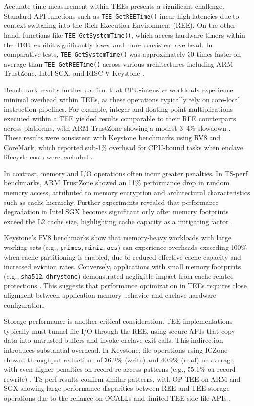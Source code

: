 Accurate time measurement within TEEs presents a significant challenge. Standard API functions such as \texttt{TEE\_GetREETime()} incur high latencies due to context switching into the Rich Execution Environment (REE). On the other hand, functions like \texttt{TEE\_GetSystemTime()}, which access hardware timers within the TEE, exhibit significantly lower and more consistent overhead. In comparative tests, \texttt{TEE\_GetSystemTime()} was approximately 30 times faster on average than \texttt{TEE\_GetREETime()} across various architectures including ARM TrustZone, Intel SGX, and RISC-V Keystone \cite{Suzaki2021}.

Benchmark results further confirm that CPU-intensive workloads experience minimal overhead within TEEs, as these operations typically rely on core-local instruction pipelines. For example, integer and floating-point multiplications executed within a TEE yielded results comparable to their REE counterparts across platforms, with ARM TrustZone showing a modest 3–4\% slowdown \cite{Suzaki2021}. These results were consistent with Keystone benchmarks using RV8 and CoreMark, which reported sub-1\% overhead for CPU-bound tasks when enclave lifecycle costs were excluded \cite{dayeol2019keystone}.

In contrast, memory and I/O operations often incur greater penalties. In TS-perf benchmarks, ARM TrustZone showed an 11\% performance drop in random memory access, attributed to memory encryption and architectural characteristics such as cache hierarchy. Further experiments revealed that performance degradation in Intel SGX becomes significant only after memory footprints exceed the L2 cache size, highlighting cache capacity as a mitigating factor \cite{Suzaki2021}.

Keystone's RV8 benchmarks show that memory-heavy workloads with large working sets (e.g., \texttt{primes}, \texttt{miniz}, \texttt{aes}) can experience overheads exceeding 100\% when cache partitioning is enabled, due to reduced effective cache capacity and increased eviction rates. Conversely, applications with small memory footprints (e.g., \texttt{sha512}, \texttt{dhrystone}) demonstrated negligible impact from cache-related protections \cite{dayeol2019keystone}. This suggests that performance optimization in TEEs requires close alignment between application memory behavior and enclave hardware configuration.

Storage performance is another critical consideration. TEE implementations typically must tunnel file I/O through the REE, using secure APIs that copy data into untrusted buffers and invoke enclave exit calls. This indirection introduces substantial overhead. In Keystone, file operations using IOZone showed throughput reductions of 36.2\% (write) and 40.9\% (read) on average, with even higher penalties on record re-access patterns (e.g., 55.1\% on record rewrite) \cite{dayeol2019keystone}. TS-perf results confirm similar patterns, with OP-TEE on ARM and SGX showing large performance disparities between REE and TEE storage operations due to the reliance on OCALLs and limited TEE-side file APIs \cite{Suzaki2021}.

